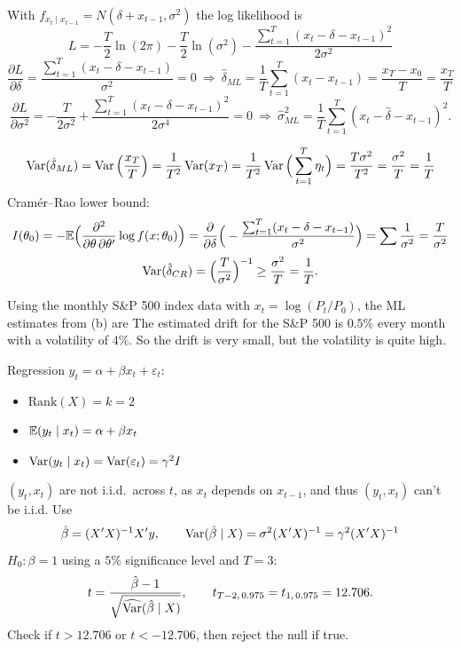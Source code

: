 \documentclass[11pt]{article}
\begin{document}
With $f_{x_t\mid x_{t-1}}=N(\delta+x_{t-1},\sigma^2)$ the log likelihood is
\[
L=-\frac T2\ln(2\pi)-\frac T2\ln(\sigma^2)-\frac{\sum_{t=1}^T(x_t-\delta-x_{t-1})^2}{2\sigma^2}
\]
\[
\frac{\partial L}{\partial\delta}=\frac{\sum_{t=1}^T(x_t-\delta-x_{t-1})}{\sigma^2}=0
\ \Rightarrow\
\hat\delta_{ML}=\frac1T\sum_{t=1}^T(x_t-x_{t-1})=\frac{x_T-x_0}{T}=\frac{x_T}{T}
\]
\[
\frac{\partial L}{\partial\sigma^2}=-\frac T{2\sigma^2}+\frac{\sum_{t=1}^T(x_t-\delta-x_{t-1})^2}{2\sigma^4}=0
\ \Rightarrow\
\hat\sigma^2_{ML}=\frac1T\sum_{t=1}^T(x_t-\hat\delta-x_{t-1})^2 .
\]

\[
\operatorname{Var}(\hat\delta_{ML})=\operatorname{Var}\Big(\frac{x_T}{T}\Big)=\frac1{T^2}\operatorname{Var}(x_T)=\frac1{T^2}\operatorname{Var}\Big(\sum_{t=1}^T\eta_t\Big)=\frac{T\sigma^2}{T^2}=\frac{\sigma^2}T=\frac1T
\]
Cram\'er--Rao lower bound:
\[
I(\theta_0)=-\mathbb{E}\Big(\frac{\partial^2}{\partial\theta\,\partial\theta'}\log f(x;\theta_0)\Big)
=\frac{\partial}{\partial\delta}\Big(-\frac{\sum_{t=1}^T(x_t-\delta-x_{t-1})}{\sigma^2}\Big)=\sum\frac1{\sigma^2}=\frac T{\sigma^2}
\]
\[
\operatorname{Var}(\hat\delta_{CR})=\Big(\frac T{\sigma^2}\Big)^{-1}\geq\frac{\sigma^2}T=\frac1T .
\]

\subq{(d)}
Using the monthly S\&P 500 index data with $x_t=\log(P_t/P_0)$, the ML estimates from (b) are
The estimated drift for the S\&P 500 is $0.5\%$ every month with a volatility of $4\%$. So the drift is very small, but the volatility is quite high.

\subq{(e)}
Regression $y_t=\alpha+\beta x_t+\varepsilon_t$:
\begin{itemize}[nosep]
\item[GM1] $\mathrm{Rank}(X)=k=2$ \checkmark
\item[GM2] $\mathbb{E}(y_t\mid x_t)=\alpha+\beta x_t$ \checkmark
\item[GM3] $\operatorname{Var}(y_t\mid x_t)=\operatorname{Var}(\varepsilon_t)=\gamma^2I$ \checkmark
\end{itemize}
$(y_t,x_t)$ are not i.i.d.\ across $t$, as $x_t$ depends on $x_{t-1}$, and thus $(y_t,x_t)$ can't be i.i.d. Use
\[
\hat\beta=(X'X)^{-1}X'y,\qquad\operatorname{Var}(\hat\beta\mid X)=\sigma^2(X'X)^{-1}=\gamma^2(X'X)^{-1}
\]
$H_0:\beta=1$ using a $5\%$ significance level and $T=3$:
\[
t=\frac{\hat\beta-1}{\sqrt{\widehat{\operatorname{Var}}(\hat\beta\mid X)}},\qquad t_{T-2,\,0.975}=t_{1,\,0.975}=12.706 .
\]
Check if $t>12.706$ or $t<-12.706$, then reject the null if true.

\end{document}
